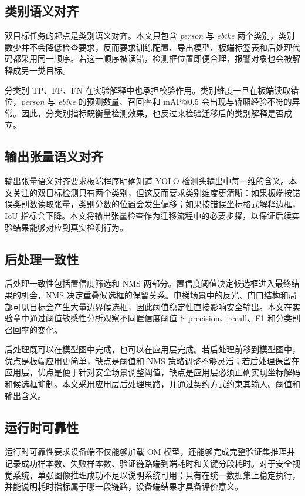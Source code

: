\subsection{类别语义对齐}

双目标任务的起点是类别语义对齐。本文只包含 \textit{person} 与 \textit{ebike} 两个类别，类别数少并不会降低检查要求，反而要求训练配置、导出模型、板端标签表和后处理代码都采用同一顺序。若这一顺序被读错，检测框位置即便合理，报警对象也会被解释成另一类目标。

分类别 TP、FP、FN 在实验解释中也承担校验作用。类别维度一旦在板端读取错位，\textit{person} 与 \textit{ebike} 的预测数量、召回率和 mAP@0.5 会出现与轿厢经验不符的异常。因此，分类别指标既衡量检测效果，也反过来检验迁移后的类别解释是否成立。

\subsection{输出张量语义对齐}

输出张量语义对齐要求板端程序明确知道 YOLO 检测头输出中每一维的含义。本文关注的双目标检测只有两个类别，但这反而要求类别维度更清晰：如果板端按错误类别数读取张量，类别分数的位置会发生偏移；如果按错误坐标格式解释边框，IoU 指标会下降。本文将输出张量检查作为迁移流程中的必要步骤，以保证后续实验结果能够对应到真实检测行为。

\subsection{后处理一致性}

后处理一致性包括置信度筛选和 NMS 两部分。置信度阈值决定候选框进入最终结果的机会，NMS 决定重叠候选框的保留关系。电梯场景中的反光、门口结构和局部可见目标会产生大量边界候选框，因此阈值稳定性直接影响安全输出。本文在实验章中通过阈值敏感性分析观察不同置信度阈值下 precision、recall、F1 和分类别召回率的变化。

后处理既可以在模型图中完成，也可以在应用层完成。若后处理前移到模型图中，优点是板端应用更简单，缺点是阈值和 NMS 策略调整不够灵活；若后处理保留在应用层，优点是便于针对安全场景调整阈值，缺点是应用层必须正确实现坐标解码和候选框抑制。本文采用应用层后处理思路，并通过契约方式约束其输入、阈值和输出含义。

\subsection{运行时可靠性}

运行时可靠性要求设备端不仅能够加载 OM 模型，还能够完成完整验证集推理并记录成功样本数、失败样本数、验证链路端到端耗时和关键分段耗时。对于安全视觉系统，单张图像推理成功不足以说明系统可用；只有在统一数据集上稳定执行，并能说明耗时指标属于哪一段链路，设备端结果才具备评价意义。


